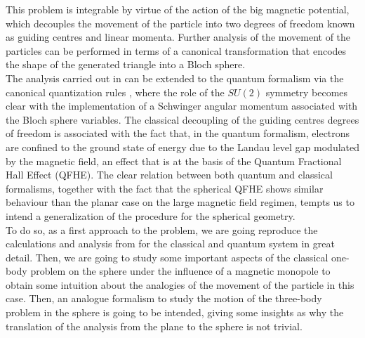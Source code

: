 This problem is integrable by virtue of the action of the big magnetic potential, which decouples the movement of  the particle into two degrees of freedom known as guiding centres and linear momenta. Further analysis of the movement of the particles can be performed in terms of a canonical transformation that encodes the shape of the generated triangle into a Bloch sphere.\\

The analysis carried out in \cite{alonso} can be extended to the quantum formalism via the canonical quantization rules \cite{Cq}, where the role of the $SU(2)$ symmetry becomes clear with the implementation of a Schwinger angular momentum associated with the Bloch sphere variables. The classical decoupling of the guiding centres degrees of freedom is associated with the fact that, in the quantum formalism, electrons are confined to the ground state of energy due to the Landau level gap modulated by the magnetic field, an effect that is at the basis of the Quantum Fractional Hall Effect (QFHE). The clear relation between both quantum and classical formalisms, together with the fact that the spherical QFHE shows similar behaviour than the planar case on the large magnetic field regimen, tempts us to intend a generalization of the procedure for the spherical geometry.  \\

To do so, as a first approach to the problem, we are going reproduce the calculations and analysis from \cite{alonso} for the classical and quantum system in great detail. Then, we are going to study some important aspects of the classical one-body problem on the sphere under the influence of a magnetic monopole to obtain some intuition about the analogies of the movement of the particle in this case. Then, an analogue formalism to study the motion of the three-body problem in the sphere is going to be intended, giving some insights as why the translation of the analysis from the plane to the sphere is not trivial.
